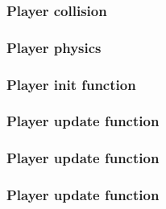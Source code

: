 \documentclass[red]{beamer}
\begin{document}
\begin{frame}
    \frametitle{Player collision}
        \lstllllllllllll
\end{frame}

\begin{frame}
    \frametitle{Player physics}
        \lstlllllllllllll
\end{frame}

\begin{frame}
    \frametitle{Player init function}
        \lstllllllllllllll
\end{frame}

\begin{frame}
    \frametitle{Player update function}
        \lstlllllllllllllll
\end{frame}

\begin{frame}
    \frametitle{Player update function}
        \lstllllllllllllllll
\end{frame}

\begin{frame}
    \frametitle{Player update function}
        \lstlllllllllllllllll
\end{frame}
\end{document}
